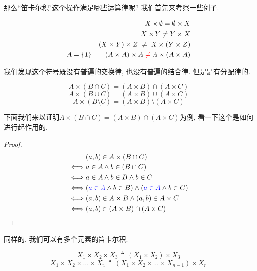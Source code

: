 那么``笛卡尔积''这个操作满足哪些运算律呢? 我们首先来考察一些例子. 

\begin{eg}
  
  \begin{align*}
  X\times \emptyset = \emptyset \times X \\
  X\times Y \neq  Y \times X \\
  (X \times Y) \times Z \;\neq\; X \times (Y \times Z)\\
  A = \{1\} \qquad (A \times A) \times A \;\textcolor{red}{\neq}\; A \times (A \times A)
  \end{align*}
  
\end{eg}

我们发现这个符号既没有普遍的交换律, 也没有普遍的结合律. 但是是有分配律的. 

\begin{theorem}
  \[
    A \times (B \cap C) = (A \times B) \cap (A \times C)
  \]
  \[
    A \times (B \cup C) = (A \times B) \cup (A \times C)
  \]
  \[
    A \times (B \setminus C) = (A \times B) \setminus (A \times C)
  \]
\end{theorem}

下面我们来以证明$A \times (B \cap C) = (A \times B) \cap (A \times C)$为例, 看一下这个是如何进行起作用的. 
\begin{proof}
    \setcounter{equation}{0}
    \begin{align*}
      &(a, b) \in A \times (B \cap C) \\
      \iff& a \in A \land b \in (B \cap C) \\
      \iff& a \in A \land b \in B \land b \in C \\
      \iff& (\textcolor{blue}{a \in A} \land b \in B) \land (\textcolor{blue}{a \in A} \land b \in C) \\
      \iff& (a, b) \in A \times B \land (a, b) \in A \times C \\
      \iff& (a, b) \in (A \times B) \cap (A \times C)
  \end{align*}
\end{proof}

同样的, 我们可以有多个元素的笛卡尔积. 

\begin{definition}
  \[
    X_{1} \times X_{2} \times X_{3} \triangleq (X_{1} \times X_{2}) \times X_{3}
  \]
  \[
    X_{1} \times X_{2} \times \dots \times X_{n}
      \triangleq (X_{1} \times X_{2} \times \dots \times X_{n-1}) \times X_{n}
  \]
\end{definition}

